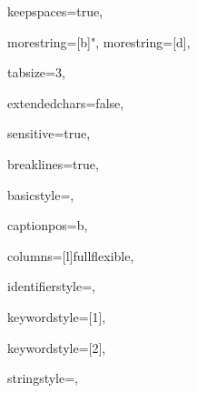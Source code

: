 {%
keepspaces=true,

morestring=[b]",
morestring=[d],

tabsize=3,

extendedchars=false,

sensitive=true,

breaklines=true,

basicstyle=\ttfamily,

captionpos=b,

columns=[l]fullflexible,


identifierstyle={\ttfamily\color{black}},

keywordstyle=[1]{\ttfamily\color{keywordcolor}},

keywordstyle=[2]{\ttfamily\color{sortcolor}},



stringstyle=\ttfamily,


}
